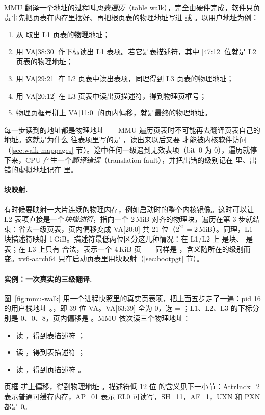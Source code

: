 MMU 翻译一个地址的过程叫\emph{页表遍历}（table walk），完全由硬件完成，软件只负责事先把页表在内存里摆好、再把根页表的物理地址写进  或 。以用户地址为例：

\begin{enumerate}
  \item 从  取出 L1 页表的\textbf{物理}地址；
  \item 用 VA[38:30] 作下标读出 L1 表项。若它是表描述符，其中 [47:12] 位就是 L2 页表的物理地址；
  \item 用 VA[29:21] 在 L2 页表中读出表项，同理得到 L3 页表的物理地址；
  \item 用 VA[20:12] 在 L3 页表中读出页描述符，得到物理页框号；
  \item 物理页框号拼上 VA[11:0] 的页内偏移，就是最终的物理地址。
\end{enumerate}

每一步读到的地址都是物理地址——MMU 遍历页表时不可能再去翻译页表自己的地址。这就是为什么  往表项里写的是 ，读出来以后又要  才能被内核软件访问（\ref{sec:walk-mappages} 节）。途中任何一级遇到无效表项（bit~0 为 0），遍历就停下来，CPU 产生一个\emph{翻译错误}（translation fault），并把出错的级别记在  里、出错的虚拟地址记在  里。

\paragraph{块映射.} 有时候要映射一大片连续的物理内存，例如启动时的整个内核镜像。这时可以让 L2 表项直接是一个\emph{块描述符}，指向一个 2\,MiB 对齐的物理块，遍历在第 3 步就结束：省去一级页表，页内偏移变成 VA[20:0] 共 21 位（$2^{21}=2$\,MiB）。同理，L1 块描述符映射 1\,GiB。描述符最低两位区分这几种情况：在 L1/L2 上  是块、 是表；在 L3 上只有  合法，表示一个 4\,KiB 页——同样是 ，含义随所在的级别而变。xv6-aarch64 只在启动页表里用块映射（\ref{sec:bootpgt} 节）。

\paragraph{实例：一次真实的三级翻译.} 图~\ref{fig:mmu-walk} 用一个进程快照里的真实页表项，把上面五步走了一遍：pid 16 的用户栈地址 。，即 39 位 VA。VA[63:39] 全为 0，选  = ；L1、L2、L3 的下标分别是 0、0、8，页内偏移是 。MMU 依次读三个物理地址：
\begin{itemize}
  \item 读 ，得到表描述符 ；
  \item 读 ，得到表描述符 ；
  \item 读 ，得到页描述符 。
\end{itemize}
页框  拼上偏移，得到物理地址 。描述符低 12 位  的含义见下一小节：AttrIndx=2 表示普通可缓存内存，AP=01 表示 EL0 可读写，SH=11，AF=1，UXN 和 PXN 都是 0。

